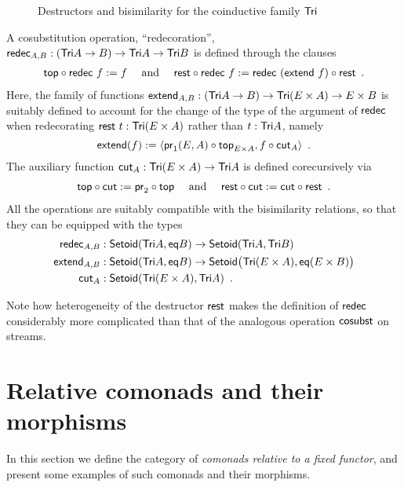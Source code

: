 \documentclass[envcountsame]{llncs}
\begin{document}
\begin{example}
\begin{figure}[bt]
  \caption{Destructors and bisimilarity for the coinductive family $\Tri$} \label{fig:tri_destructors}
\end{figure}
% 
% 
  A cosubstitution operation, \enquote{redecoration},
    $ \redec_{A,B} : (\Tri A \to B) \to \Tri A \to \Tri B$
  is defined  through the clauses
% 
  \begin{align} \comp{\redec~f}{\head} := f \quad\text{ and } \quad
                  \comp{\redec~f}{\tail} := \comp{\tail}{\redec~(\extend~f)} \enspace . \label{eq:rest_redec}
    \end{align}
Here, the family of functions 
     $\extend_{A,B} : (\Tri A \to B) \to \Tri (E \times A) \to E\times B $
  is suitably defined to account for the change of the type of the argument of $\redec$ when redecorating $\tail~t : \Tri(E\times A)$
  rather than $t : \Tri A$, namely
  \[ \extend(f) := \langle \comp{\head_{E\times A}}{\pr_1(E,A)} , \comp{\cut_A}{f} \rangle \enspace . \]
  The auxiliary function $\cut_A : \Tri(E\times A) \to \Tri A$ is defined corecursively via
% 
  \begin{align*} \comp{\cut}{\head} := \comp{\head}{\pr_2} \quad\text{ and } \quad
                     \comp{\cut}{\tail} := \comp{\tail}{\cut} \enspace . 
      \end{align*}
%       
All the operations are suitably compatible with the bisimilarity relations, so that they can be equipped with the types
  \begin{align*}
    \redec_{A,B} &: \Setoid(\Tri A,\eq B) \to \Setoid(\Tri A,\Tri B ) \\
    \extend_{A,B} &: \Setoid(\Tri A,\eq B) \to \Setoid\bigr(\Tri (E \times A),\eq(E\times B)\bigr) \\
    \cut_A &:  \Setoid(\Tri(E\times A) , \Tri A) \enspace .
  \end{align*}
\end{example}

\begin{Long}
Note how heterogeneity of the destructor $\tail$ makes the definition of $\redec$ considerably more complicated than that of
the analogous operation $\sredec$ on streams.
\end{Long}

  
\section{Relative comonads and their morphisms}\label{sec:comonads}

In this section we define the category of \emph{comonads relative to a fixed functor}, and present some examples 
of such comonads and their morphisms.
\end{document}
